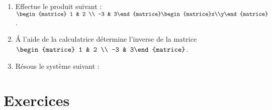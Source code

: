 \begin{exercice}[]
	\begin{enumerate}
		\item 	Effectue le produit suivant : $\begin{matrice}
				      1 & 2 \\ -3 & 3\end{matrice}\begin{matrice}x\\y\end{matrice}$.
		\item 	\'A l'aide de la calculatrice détermine l'inverse de la matrice $\begin{matrice}
				      1 & 2 \\ -3 & 3\end{matrice}$.
		\item Résous le système suivant : 
	\end{enumerate}
\end{exercice}


\section{Exercices}

